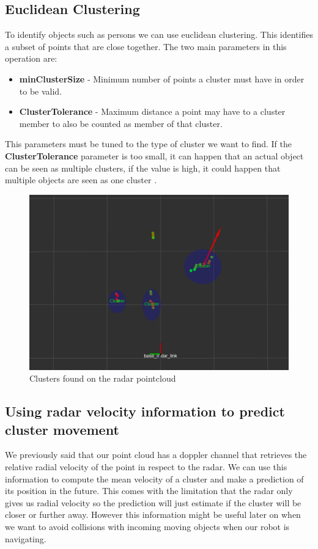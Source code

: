 \documentclass[12pt]{article}
\begin{document}
\subsection{Euclidean Clustering}
To identify objects such as persons we can use euclidean clustering. This identifies a subset of points that are close together. The two main parameters in this operation are:
\begin{itemize}
\item \textbf{minClusterSize} - Minimum number of points a cluster must have in order to be valid.
\item \textbf{ClusterTolerance}  - Maximum distance a point may have to a cluster member to also be counted as member of that cluster.
\end{itemize}
This parameters must be tuned to the type of cluster we want to find. 
If the \textbf{ClusterTolerance} parameter is too small, it can happen that an actual object can be seen as multiple clusters, if the value is high, it could happen that multiple objects are seen as one cluster \cite{cluster}.
\begin{figure}[!htb]
    \centering
    \includegraphics[scale=0.27]{cluster.png}
    \caption{Clusters found on the radar pointcloud}
    \label{fig:clustering}
\end{figure}
\subsection{Using radar velocity information to predict cluster movement}

We previously said that our point cloud has a doppler channel that retrieves the relative radial velocity of the point in respect to the radar. We can use this information to compute the mean velocity of a cluster and make a prediction of its position in the future. This comes with the limitation that the radar only gives us radial velocity so the prediction will just estimate if the cluster will be closer or further away. 
However this information might be useful later on when we want to avoid collisions with incoming moving objects when our robot is navigating.
\end{document}
